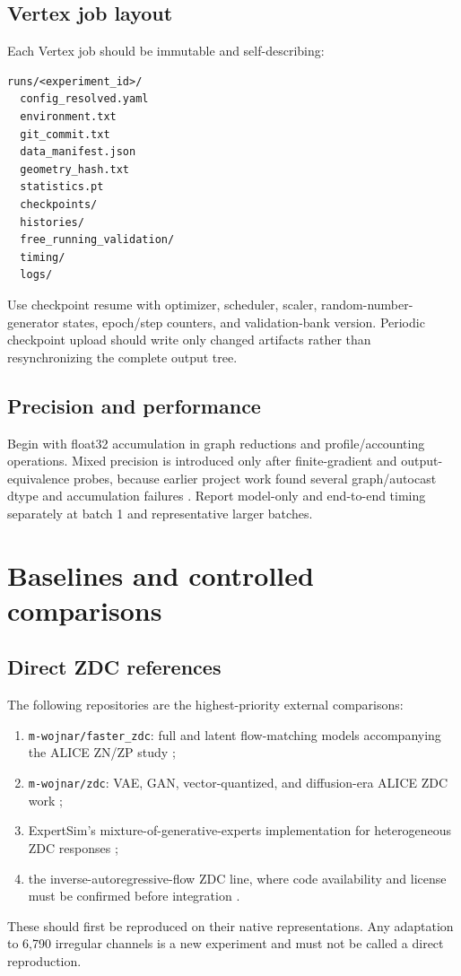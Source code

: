 \documentclass[11pt]{article}
\theoremstyle{definition}
\theoremstyle{remark}
\newcommand{\code}[1]{\texttt{#1}}
\begin{document}
\subsection{Vertex job layout}
Each Vertex job should be immutable and self-describing:
\begin{lstlisting}
runs/<experiment_id>/
  config_resolved.yaml
  environment.txt
  git_commit.txt
  data_manifest.json
  geometry_hash.txt
  statistics.pt
  checkpoints/
  histories/
  free_running_validation/
  timing/
  logs/
\end{lstlisting}
Use checkpoint resume with optimizer, scheduler, scaler, random-number-generator states, epoch/step counters, and validation-bank version. Periodic checkpoint upload should write only changed artifacts rather than resynchronizing the complete output tree.

\subsection{Precision and performance}
Begin with float32 accumulation in graph reductions and profile/accounting operations. Mixed precision is introduced only after finite-gradient and output-equivalence probes, because earlier project work found several graph/autocast dtype and accumulation failures \citep{project_hgf_audit}. Report model-only and end-to-end timing separately at batch 1 and representative larger batches.

\section{Baselines and controlled comparisons}

\subsection{Direct ZDC references}
The following repositories are the highest-priority external comparisons:
\begin{enumerate}[leftmargin=2em]
  \item \code{m-wojnar/faster\_zdc}: full and latent flow-matching models accompanying the ALICE ZN/ZP study \citep{fasterzdc,fasterzdc_code};
  \item \code{m-wojnar/zdc}: VAE, GAN, vector-quantized, and diffusion-era ALICE ZDC work \citep{zdc_code,zdcmachinelearning,zdcdiffusion};
  \item ExpertSim's mixture-of-generative-experts implementation for heterogeneous ZDC responses \citep{expertsim};
  \item the inverse-autoregressive-flow ZDC line, where code availability and license must be confirmed before integration \citep{zdc_iaf}.
\end{enumerate}
These should first be reproduced on their native representations. Any adaptation to 6,790 irregular channels is a new experiment and must not be called a direct reproduction.
\end{document}
